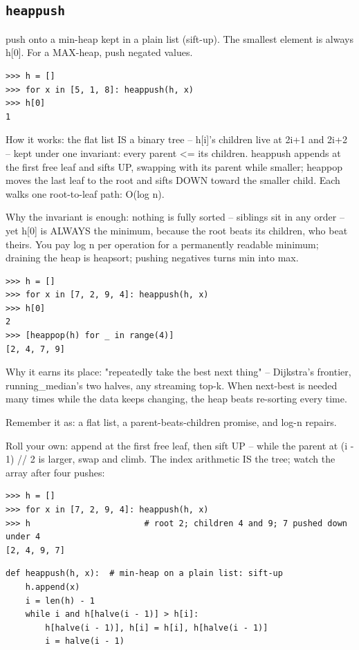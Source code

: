 \documentclass[10pt,letterpaper]{book}
\begin{document}
\subsection{\texttt{heappush}}\label{def:heappush}
push onto a min-heap kept in a plain list (sift-up). The smallest element is always h[0]. For a MAX-heap, push negated values.
\begin{lstlisting}[style=ex]
>>> h = []
>>> for x in [5, 1, 8]: heappush(h, x)
>>> h[0]
1
\end{lstlisting}

How it works: the flat list IS a binary tree -- h[i]'s children live at 2i+1 and 2i+2 -- kept under one invariant: every parent <= its children. heappush appends at the first free leaf and sifts UP, swapping with its parent while smaller; heappop moves the last leaf to the root and sifts DOWN toward the smaller child. Each walks one root-to-leaf path: O(log n).


Why the invariant is enough: nothing is fully sorted -- siblings sit in any order -- yet h[0] is ALWAYS the minimum, because the root beats its children, who beat theirs. You pay log n per operation for a permanently readable minimum; draining the heap is heapsort; pushing negatives turns min into max.

\begin{lstlisting}[style=ex]
>>> h = []
>>> for x in [7, 2, 9, 4]: heappush(h, x)
>>> h[0]
2
>>> [heappop(h) for _ in range(4)]
[2, 4, 7, 9]
\end{lstlisting}

Why it earns its place: "repeatedly take the best next thing" -- Dijkstra's frontier, running\_median's two halves, any streaming top-k. When next-best is needed many times while the data keeps changing, the heap beats re-sorting every time.


Remember it as: a flat list, a parent-beats-children promise, and log-n repairs.


Roll your own: append at the first free leaf, then sift UP -- while the parent at (i - 1) // 2 is larger, swap and climb. The index arithmetic IS the tree; watch the array after four pushes:

\begin{lstlisting}[style=ex]
>>> h = []
>>> for x in [7, 2, 9, 4]: heappush(h, x)
>>> h                       # root 2; children 4 and 9; 7 pushed down under 4
[2, 4, 9, 7]
\end{lstlisting}
\begin{lstlisting}[style=ex]
def heappush(h, x):  # min-heap on a plain list: sift-up
    h.append(x)
    i = len(h) - 1
    while i and h[halve(i - 1)] > h[i]:
        h[halve(i - 1)], h[i] = h[i], h[halve(i - 1)]
        i = halve(i - 1)
\end{lstlisting}
\end{document}
